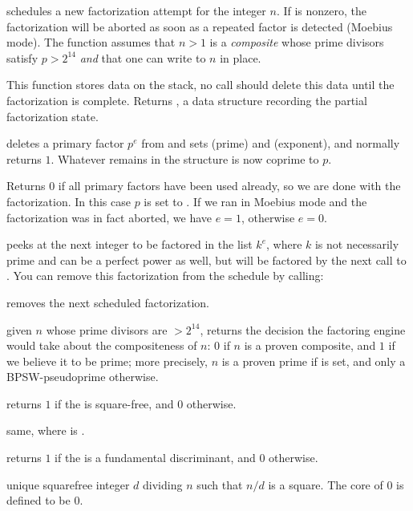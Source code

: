  schedules a new factorization
attempt for the integer $n$. If  is nonzero, the factorization
will be aborted as soon as a repeated factor is detected (Moebius mode).
The function assumes that $n > 1$ is a \emph{composite}  whose prime
divisors satisfy $p > 2^{14}$ \emph{and} that one can write to $n$ in place.

This function stores data on the stack, no  call should
delete this data until the factorization is complete. Returns ,
a data structure recording the partial factorization state.

 deletes a primary factor
$p^e$ from  and sets  (prime) and  (exponent), and
normally returns $1$. Whatever remains in the  structure is now
coprime to $p$.

Returns $0$ if all primary factors have been used already, so we are done
with the factorization. In this case $p$ is set to . If we ran in
Moebius mode and the factorization was in fact aborted, we have $e = 1$,
otherwise $e = 0$.

 peeks at the next integer
to be factored in the list $k^e$, where $k$ is not necessarily prime
and can be a perfect power as well, but will be factored by the next call to
. You can remove this factorization from the schedule by
calling:

 removes the next scheduled factorization.

 given $n$ whose prime divisors are $> 2^{14}$,
returns the decision the factoring engine would take about the compositeness
of $n$: $0$ if $n$ is a proven composite, and $1$ if we believe it to be
prime; more precisely, $n$ is a proven prime if  is
set, and only a BPSW-pseudoprime otherwise.


 returns $1$ if the  
is square-free, and $0$ otherwise.

 same, where  is
.

 returns $1$ if the  
is a fundamental discriminant, and $0$ otherwise.

 unique squarefree integer $d$ dividing $n$ such that
$n/d$ is a square. The core of $0$ is defined to be $0$.

